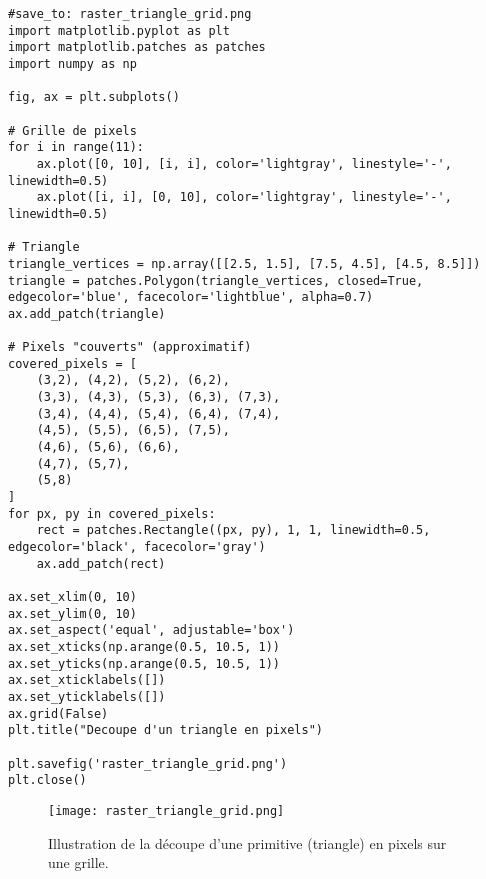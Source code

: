 \documentclass{article}
\begin{document}
\begin{verbatim}
#save_to: raster_triangle_grid.png
import matplotlib.pyplot as plt
import matplotlib.patches as patches
import numpy as np

fig, ax = plt.subplots()

# Grille de pixels
for i in range(11):
    ax.plot([0, 10], [i, i], color='lightgray', linestyle='-', linewidth=0.5)
    ax.plot([i, i], [0, 10], color='lightgray', linestyle='-', linewidth=0.5)

# Triangle
triangle_vertices = np.array([[2.5, 1.5], [7.5, 4.5], [4.5, 8.5]])
triangle = patches.Polygon(triangle_vertices, closed=True, edgecolor='blue', facecolor='lightblue', alpha=0.7)
ax.add_patch(triangle)

# Pixels "couverts" (approximatif)
covered_pixels = [
    (3,2), (4,2), (5,2), (6,2),
    (3,3), (4,3), (5,3), (6,3), (7,3),
    (3,4), (4,4), (5,4), (6,4), (7,4),
    (4,5), (5,5), (6,5), (7,5),
    (4,6), (5,6), (6,6),
    (4,7), (5,7),
    (5,8)
]
for px, py in covered_pixels:
    rect = patches.Rectangle((px, py), 1, 1, linewidth=0.5, edgecolor='black', facecolor='gray')
    ax.add_patch(rect)

ax.set_xlim(0, 10)
ax.set_ylim(0, 10)
ax.set_aspect('equal', adjustable='box')
ax.set_xticks(np.arange(0.5, 10.5, 1))
ax.set_yticks(np.arange(0.5, 10.5, 1))
ax.set_xticklabels([])
ax.set_yticklabels([])
ax.grid(False)
plt.title("Decoupe d'un triangle en pixels")

plt.savefig('raster_triangle_grid.png')
plt.close()
\end{verbatim}

\begin{figure}[H]
\centering
\texttt{[image: raster\_triangle\_grid.png]}
\caption{Illustration de la découpe d'une primitive (triangle) en pixels sur une grille.}
\label{fig:raster_triangle_grid}
\end{figure}
\end{document}
